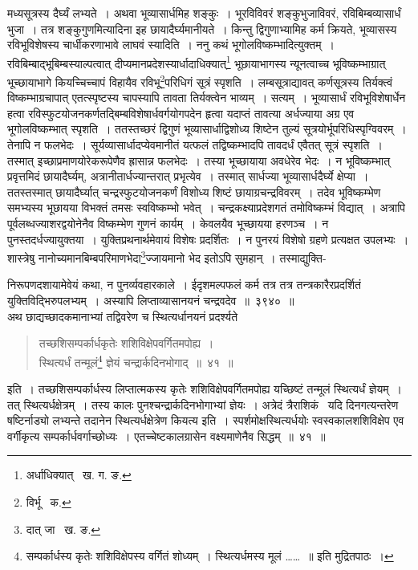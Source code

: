 \documentclass[11pt, openany]{book}
\begin{document}
\noindent मध्यसूत्रस्य दैर्घ्यं लभ्यते~। अथवा भूव्यासार्धमिह शङ्कुः~। भूरविविवरं शङ्कुभुजाविवरं, रविबिम्बव्यासार्धं भुजा~। तत्र शङ्कुगुणमित्यादिना इह छायादैर्घ्यमानीयते~। किन्तु द्विगुणाभ्यामिह कर्म क्रियते, भूव्यासस्य रविभूविशेषस्य चार्धीकरणाभावे लाघवं स्यादिति~।
ननु कथं भूगोलविष्कम्भादित्युक्तम्~। रविबिम्बाद्भूबिम्बस्याल्पत्वात् दीप्यमानप्रदेशस्यार्धादाधिक्यात्\renewcommand{\thefootnote}{१}\footnote{अर्धाधिक्यात् \textendash\ ख. ग. ङ.} भूछायाभागस्य न्यूनत्वाच्च भूविष्कम्भाग्रात् भूच्छायाभागे कियच्चिच्चापं विहायैव रविभू\renewcommand{\thefootnote}{२}\footnote{विर्भू \textendash\ क.}परिधिगं सूत्रं स्पृशति~। लम्बसूत्राद्यावत् कर्णसूत्रस्य तिर्यक्त्वं विष्कम्भाग्रचापात् एतत्स्पृष्टस्य चापस्यापि तावता तिर्यक्त्वेन भाव्यम्~। सत्यम्~। भूव्यासार्धं रविभूविशेषार्धेन हत्वा रविस्फुटयोजनकर्णतद्बिम्बविशेषार्धवर्गयोगपदेन हृत्वा यदाप्तं तावत्या अर्धज्याया अग्र एव भूगोलविष्कम्भात् स्पृशति~। ततस्तच्छरं द्विगुणं भूव्यासार्धाद्विशोध्य शिष्टेन तुल्यं सूत्रयोर्भूपरिधिस्पृग्विवरम्~। तेनापि न फलभेदः~। सूर्यव्यासार्धादप्येवमानीतं यत्फलं तद्विष्कम्भादपि तावदर्धं एवैतत् सूत्रं स्पृशति~। तस्मात् इच्छाप्रमाणयोरेकरूपेणैव ह्रासान्न फलभेदः~। तस्या भूच्छायाया अवधेरेव भेदः~। न भूविष्कम्भात् प्रवृत्तमिदं छायादैर्घ्यम्, अत्रानीतार्धज्यान्तरात् प्रभृत्येव~। तस्मात् सार्धज्या भूव्यासार्धदैर्घ्ये क्षेप्या~। ततस्तस्मात् छायादैर्घ्यात्
चन्द्रस्फुटयोजनकर्णं विशोध्य शिष्टं छायाग्रचन्द्रविवरम्~। तदेव भूविष्कम्भेण समभ्यस्य भूछायया विभक्तं तमसः स्वविष्कम्भो भवेत्~।
चन्द्रकक्ष्याप्रदेशगतं तमोविष्कम्भं विद्यात्~। अत्रापि पूर्वलब्धज्याशरद्वयोनेनैव विष्कम्भेण गुणनं कार्यम्~। केवलयैव भूच्छायया हरणञ्च~।
न पुनस्तदर्धज्यायुक्तया~। युक्तिप्रथनार्थमेवायं विशेषः प्रदर्शितः~। न पुनरयं विशेषो ग्रहणे प्रत्यक्षत उपलभ्यः~। शास्त्रेषु नानोच्यमानबिम्बपरिमाणभेदा\renewcommand{\thefootnote}{२}\footnote{दात् जा \textendash\ ख. ङ.}ज्जायमानो भेद इतोऽपि सुमहान्~। तस्माद्युक्ति- 

\newpage

\noindent निरूपणदशायामेवेयं कथा, न पुनर्व्यवहारकाले~। ईदृशमल्पफलं कर्म तत्र तत्र तन्त्रकारैरप्रदर्शितं युक्तिविद्भिरुपलभ्यम्~। अस्यापि लिप्ताव्यासानयनं चन्द्रवदेव~॥~३९\textendash ४०~॥ \\

\indent अथ छाद्यच्छादकमानाभ्यां तद्विवरेण च स्थित्यर्धानयनं प्रदर्श्यते\textendash 
\begin{quote}
{\ab तच्छशिसम्पर्कार्धकृतेः शशिविक्षेपवर्गितमपोह्य~।\\
स्थित्यर्धं तन्मूलं\renewcommand{\thefootnote}{१}\footnote{सम्पर्कार्धस्य कृतेः शशिविक्षेपस्य वर्गितं शोध्यम्~। स्थित्यर्धमस्य मूलं \ldots \ldots~॥ इति मुद्रितपाठः~।} ज्ञेयं चन्द्रार्कदिनभोगाद्~॥~४१~॥}
\end{quote}
\indent इति~। तच्छशिसम्पर्कार्धस्य लिप्तात्मकस्य कृतेः शशिविक्षेपवर्गितमपोह्य यच्छिष्टं तन्मूलं स्थित्यर्धं ज्ञेयम्~। तत् स्थित्यर्धक्षेत्रम्~।
तस्य कालः पुनश्चन्द्रार्कदिनभोगाभ्यां ज्ञेयः~। अत्रेदं त्रैराशिकं \textendash\ यदि दिनगत्यन्तरेण षष्टिर्नाड्यो लभ्यन्ते तदानेन स्थित्यर्धक्षेत्रेण कियत्य इति~। स्पर्शमोक्षस्थित्यर्धयोः स्वस्वकालशशिविक्षेप एव वर्गीकृत्य सम्पर्कार्धवर्गाच्छोध्यः~। एतच्चेष्टकालग्रासेन वक्ष्यमाणेनैव सिद्धम्~॥~४१~॥ \\
\end{document}
